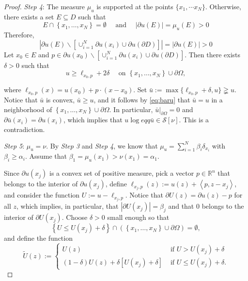 \documentclass[twoside, 12pt]{book}
\numberwithin{equation}{chapter}
\def\cS{{\mathcal S}}
\def\l{\left}
\def\r{\right}
\def\geq{\geqslant}
\def\leq{\leqslant}
\def\p{\partial}
\begin{document}
\begin{proof}
		{\em Step 4}: The measure $\mu_u$ is supported at the points $\{x_1,\cdots x_N\}$. Otherwise, there exists a set $E\subseteq D$ such that
		$$
		E \cap\left\{x_1, \ldots, x_N\right\}=\emptyset \quad \text { and } \quad|\partial u(E)|=\mu_u(E)>0
		$$
		Therefore, 
		$$
		\l|\partial u(E)\backslash [\cup_{i=1}^{N} \p u(x_i)\cup \p u(\p D)]\r|=|\p u (E)|>0 
		$$
		Let $x_0\in E$ and $p\in \p u(x_0)\backslash [\cup_{i=1}^{N} \p u(x_i)\cup \p u(\p D)]$. Then there exists $\delta>0$ such that
		\begin{equation}\label{eq:baru}
			u \geq \ell_{x_0, p}+2 \delta \quad \text { on }\left\{x_1, \ldots, x_N\right\} \cup \partial \Omega, 
		\end{equation}
		
		where $\ell_{x_0, p}(x)=u(x_0)+p\cdot (x-x_0)$. Set $\bar{u}:=\max\{\ell_{x_0, p}+\delta, u\}\gneqq u$. Notice that $\bar{u}$ is convex, $\bar{u} \geqslant u$, and it follows by \eqref{eq:baru} that $\bar{u}=u$ in a neighborhood of $\left\{x_1, \ldots, x_N\right\} \cup \partial \Omega$. In particular, $\left.\bar{u}\right|_{\partial \Omega}=0$ and $\partial \bar{u}\left(x_i\right)=\partial u\left(x_i\right)$, which implies that $u\log eqq\bar u\in \cS[\nu]$. This is a contradiction. 
		
		{\em Step 5}: $\mu_u=\nu$. By {\em Step 3} and {\em Step 4}, we know that $\mu_{u}=\sum_{i=1}^N \beta_i \delta_{x_i}$ with $\beta_i\geq \alpha_i$. Assume that $\beta_1=\mu_u(x_1)>\nu(x_1)=\alpha_1$. 
		
		Since $\partial u\left(x_j\right)$ is a convex set of positive measure, pick a vector $p \in \mathbb{R}^n$ that belongs to the interior of $\partial u\left(x_j\right)$, define $\ell_{x_j, p}(z):=u(z)+\left\langle p, z-x_j\right\rangle$, and consider the function $U:=u-\ell_{x_j, p}$. Notice that $\partial U(z)=\partial u(z)-p$ for all $z$, which implies, in particular, that $\left|\partial U\left(x_j\right)\right|=\beta_j$ and that 0 belongs to the interior of $\partial U\left(x_j\right)$.
		Choose $\delta>0$ small enough so that
		$$
		\left\{U \leq U\left(x_j\right)+\delta\right\} \cap\left(\left\{x_1, \ldots, x_N\right\} \cup \partial \Omega\right)=\emptyset,
		$$
		and define the function
		$$
		\widetilde{U}(z):= \begin{cases}U(z) & \text { if } U>U\left(x_j\right)+\delta \\ (1-\delta) U(z)+\delta\left[U\left(x_j\right)+\delta\right] & \text { if } U \leq U\left(x_j\right)+\delta .\end{cases}
		$$
		

\end{proof}
\end{document}
